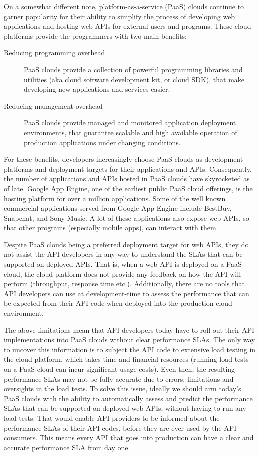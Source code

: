 On a somewhat different note, platform-as-a-service (PaaS) clouds continue to garner 
popularity for their ability to simplify the process of developing web applications and
hosting web APIs for external users and programs. These cloud platforms provide the
programmers with two main benefits:

\begin{description}
\item[Reducing programming overhead] PaaS clouds provide a collection of powerful programming 
libraries and utilities (aka cloud software development kit, or cloud SDK), that make developing new applications 
and services easier.
\item[Reducing management overhead] PaaS clouds provide managed and monitored application deployment
environments, that guarantee scalable and high available operation of production applications under
changing conditions.
\end{description}

For these benefits, developers increasingly choose PaaS clouds as development platforms
and deployment targets for their applications and APIs. Consequently, the number of applications and 
APIs hosted in PaaS clouds have skyrocketed as of late. Google App Engine, one of the earliest
public PaaS cloud offerings, is the hosting platform for over a million applications. Some of the
well known commercial applications served from Google App Engine include BestBuy, Snapchat, 
and Sony Music. A lot of these applications also expose web APIs, so that other
programs (especially mobile apps), can interact with them.

Despite PaaS clouds being a preferred deployment target for web APIs, they do not assist the API
developers in any way to understand the SLAs that can be supported on deployed APIs. That is,
when a web API is deployed on a PaaS cloud, the cloud platform does not provide any feedback 
on how the API will perform (throughput, response time etc.). Additionally,
there are no tools that API developers can use at development-time to assess the performance
that can be expected from their API code when deployed into the production cloud environment.

The above limitations mean that API developers today have to roll out their API implementations into PaaS
clouds without clear performance SLAs. The only way to uncover this information is to subject the API
code to extensive load testing in the cloud platform, which takes time and financial resources
(running load tests on a PaaS cloud can incur significant usage costs). Even then, the resulting
performance SLAs may not be fully accurate due to errors, limitations and oversights in the load tests.
To solve this issue, ideally we should arm today's PaaS clouds with the ability to automatically assess and
predict the performance SLAs that can be supported on deployed web APIs, without having to
run any load tests. That would enable API providers to be informed about the performance
SLAs of their API codes, before they are ever used by the API consumers. This means
every API that goes into production can have a clear and accurate performance SLA from
day one.

